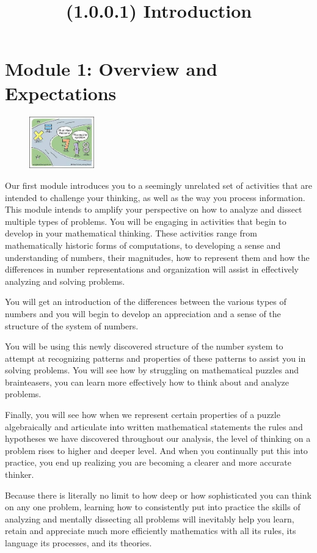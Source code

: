 \documentclass{article}
\title{(1.0.0.1) Introduction}
\begin{document}
\section*{Module 1: Overview and Expectations}

\begin{figure}
  \includegraphics[width=0.25\textwidth]{numbers-walking.jpg}
\end{figure}
Our first module introduces you to a seemingly unrelated set of activities that are intended to challenge your thinking, as well as the way you process information.  This module intends to amplify your perspective on how to analyze and dissect multiple types of problems.  You will be engaging in activities that begin to develop in your mathematical thinking.  These activities range from mathematically historic forms of computations, to developing a sense and understanding of numbers, their magnitudes, how to represent them and how the differences in number representations and organization will assist in effectively analyzing and solving problems.  

You will get an introduction of the differences between the various types of numbers and you will begin to develop an appreciation and a sense of the structure of the system of numbers.

You will be using this newly discovered structure of the number system to attempt at recognizing patterns and properties of these patterns to assist you in solving problems.  You will see how by struggling on mathematical puzzles and brainteasers, you can learn more effectively how to think about and analyze problems.  

Finally, you will see how when we represent certain properties of a puzzle algebraically and articulate into written mathematical statements the rules and hypotheses we have discovered throughout our analysis, the level of thinking on a problem rises to higher and deeper level.  And when you continually put this into practice, you end up realizing you are becoming a clearer and more accurate thinker.  

Because there is literally no limit to how deep or how sophisticated you can think on any one problem, learning how to consistently put into practice the skills of analyzing and mentally dissecting all problems will inevitably help you learn, retain and appreciate much more efficiently mathematics with all its rules, its language its processes, and its theories.
\end{document}

